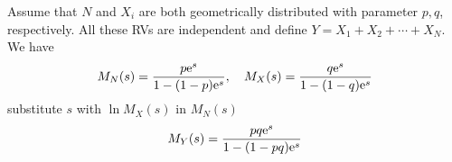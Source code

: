 \begin{example}
    Assume that $N$ and $X_i$ are both geometrically distributed with parameter $p, q$, respectively. All these RVs are independent and define $Y = X_1 + X_2 + \cdots + X_N$. \\ 
    We have
    \begin{equation}
        M_{N}(s) = \frac{p \mathrm{e}^s}{1 - (1-p) \mathrm{e}^s}, \quad M_{X}(s) = \frac{q \mathrm{e}^s}{1 - (1-q) \mathrm{e}^s}
    \end{equation}
    substitute $s$ with $\ln M_{X}(s)$ in $M_{N}(s)$
    \begin{equation}
        M_Y(s) = \frac{pq \mathrm{e}^s}{1 - (1-pq) \mathrm{e}^s}
    \end{equation}
\end{example}
